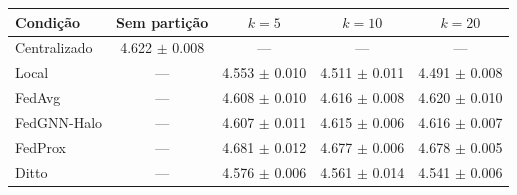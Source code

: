 
\begin{tabular}{lcccc}
\toprule
Condição & Sem partição & $k=5$ & $k=10$ & $k=20$ \\
\midrule
Centralizado & \num{4.622} $\pm$ \num{0.008} & --- & --- & --- \\
\midrule
Local & --- & \num{4.553} $\pm$ \num{0.010} & \num{4.511} $\pm$ \num{0.011} & \num{4.491} $\pm$ \num{0.008} \\
FedAvg & --- & \num{4.608} $\pm$ \num{0.010} & \num{4.616} $\pm$ \num{0.008} & \num{4.620} $\pm$ \num{0.010} \\
FedGNN-Halo & --- & \num{4.607} $\pm$ \num{0.011} & \num{4.615} $\pm$ \num{0.006} & \num{4.616} $\pm$ \num{0.007} \\
FedProx & --- & \num{4.681} $\pm$ \num{0.012} & \num{4.677} $\pm$ \num{0.006} & \num{4.678} $\pm$ \num{0.005} \\
Ditto & --- & \num{4.576} $\pm$ \num{0.006} & \num{4.561} $\pm$ \num{0.014} & \num{4.541} $\pm$ \num{0.006} \\
\bottomrule
\end{tabular}
